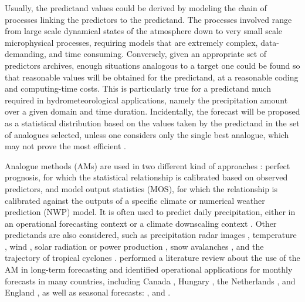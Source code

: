 \documentclass[review]{elsarticle}
\begin{document}
Usually, the predictand values could be derived by modeling the chain of processes linking the predictors to the predictand. The processes involved range from large scale dynamical states of the atmosphere down to very small scale microphysical processes, requiring models that are extremely complex, data-demanding, and time consuming. Conversely, given an appropriate set of predictors archives, enough situations analogous to a target one could be found so that reasonable values will be obtained for the predictand, at a reasonable coding and computing-time costs. This is particularly true for a predictand much required in hydrometeorological applications, namely the precipitation amount over a given domain and time duration. Incidentally, the forecast will be proposed as a statistical distribution based on the values taken by the predictand in the set of analogues selected, unless one considers only the single best analogue, which may not prove the most efficient \citep{Bontron2005}.

Analogue methods (AMs) are used in two different kind of approaches \citep{Rummukainen1997}: perfect prognosis, for which the statistical relationship is calibrated based on observed predictors, and model output statistics (MOS), for which the relationship is calibrated against the outputs of a specific climate or numerical weather prediction (NWP) model. It is often used to predict daily precipitation, either in an operational forecasting context \citep[e.g.][]{Guilbaud1997, Bontron2005, Hamill2006, Bliefernicht2010, Marty2012, Horton2012, Hamill2015, BenDaoud2016} or a climate downscaling context \citep[e.g.][]{Zorita1999, Wetterhall2005, Wetterhall2007, Matulla2007, Radanovics2013, Chardon2014, Dayon2015, Raynaud2016b}. Other predictands are also considered, such as precipitation radar images \citep{Panziera2011,Foresti2015a}, temperature \citep{Radinovic1975, Woodcock1980, Kruizinga1983, DelleMonache2013, Caillouet2016, Raynaud2016b}, wind \citep{Gordon1987, DelleMonache2013, DelleMonache2011, Vanvyve2015, Alessandrini2015, Junk2015, Junk2015c}, solar radiation or power production \citep{Alessandrini2015a, Bessa2015, Raynaud2016b}, snow avalanches \citep{Obled1980, Bolognesi1993}, and the trajectory of tropical cyclones \citep{Keenan1981, Sievers2000, Fraedrich2003}. \citet{Guilbaud1997} performed a literature review about the use of the AM in long-term forecasting and identified operational applications for monthly forecasts in many countries, including Canada \citep{Shabbar1986},  Hungary \citep{Toth1989}, the Netherlands \citep{Nap1981}, and England \citep{Murray1974}, as well as seasonal forecasts: \citet{Barnett1978}, \citet{Bergen1982} and \citet{Livezey1988}.
\end{document}
